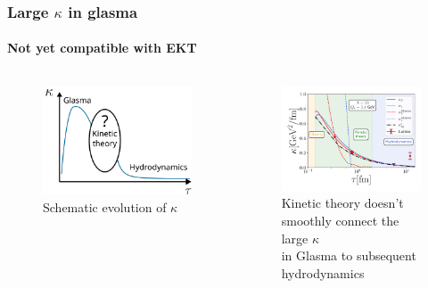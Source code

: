 \documentclass[aspectratio=169,11pt,usenames,dvipsnames]{beamer}
\begin{document}
\begin{frame}
    \frametitle{Large $\kappa$ in glasma}
    \framesubtitle{Not yet compatible with EKT}
    \vspace{-0.4cm}
    \begin{columns}[onlytextwidth,t]
        \begin{figure}[!hbt]
            \centering
            \captionsetup{justification=centering}
            \caption{Schematic evolution of $\kappa$}\vspace{-0.3cm}
            \includegraphics[width=0.8\columnwidth]{images/kappa_schematic.png}\vspace{-0.3cm}
        \end{figure}
        \begin{figure}[!hbt]
            \centering
            \captionsetup{justification=centering}
            \caption{{\color{ForestGreen}Kinetic theory} doesn't smoothly connect the large $\kappa$\\ in {\color{Dandelion}Glasma} to subsequent {\color{Periwinkle}hydrodynamics}}\vspace{-0.2cm}
            \includegraphics[width=0.8\columnwidth]{images/KappaGlasmaVsEKTvsLatticev2.pdf}
        \end{figure}
    \end{columns}   


\end{frame}
\end{document}
